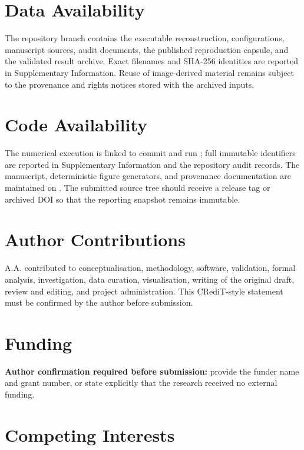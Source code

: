 \section*{Data Availability}

The repository branch  contains the executable reconstruction, configurations, manuscript sources, audit documents, the published reproduction capsule, and the validated result archive. Exact filenames and SHA-256 identities are reported in Supplementary Information. Reuse of image-derived material remains subject to the provenance and rights notices stored with the archived inputs.

\section*{Code Availability}

The numerical execution is linked to commit  and run ; full immutable identifiers are reported in Supplementary Information and the repository audit records. The manuscript, deterministic figure generators, and provenance documentation are maintained on . The submitted source tree should receive a release tag or archived DOI so that the reporting snapshot remains immutable.

\section*{Author Contributions}

A.A. contributed to conceptualisation, methodology, software, validation, formal analysis, investigation, data curation, visualisation, writing of the original draft, review and editing, and project administration. This CRediT-style statement must be confirmed by the author before submission.

\section*{Funding}

\textbf{Author confirmation required before submission:} provide the funder name and grant number, or state explicitly that the research received no external funding.

\section*{Competing Interests}

